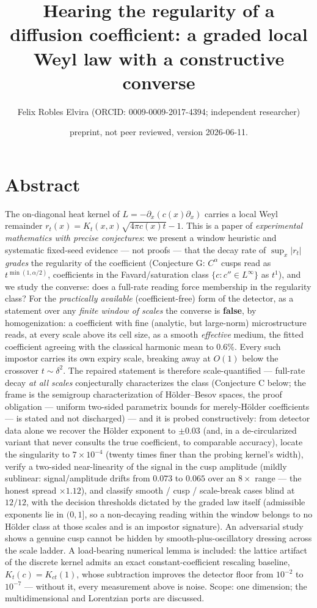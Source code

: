 \documentclass[11pt]{article}
\title{Hearing the regularity of a diffusion coefficient: a graded local Weyl law with a constructive converse}
\author{Felix Robles Elvira (ORCID: 0009-0009-2017-4394; independent researcher)}
\date{\small preprint, not peer reviewed, version 2026-06-11.}
\begin{document}
\maketitle

\section*{Abstract}
The on-diagonal heat kernel of $L = -\partial_x(c(x)\partial_x)$ carries a local Weyl remainder $r_t(x) = K_t(x,x)\sqrt{4\pi c(x)t} - 1$.  This is a paper of \emph{experimental mathematics with precise conjectures}: we present a window heuristic and systematic fixed-seed evidence — not proofs — that the decay rate of $\sup_x|r_t|$ \emph{grades} the regularity of the coefficient (Conjecture G: $C^\alpha$ cusps read as $t^{\min(1,\alpha/2)}$, coefficients in the Favard/saturation class $\{c : c'' \in L^\infty\}$ as $t^1$), and we study the converse: does a full-rate reading force membership in the regularity class?  For the \emph{practically available} (coefficient-free) form of the detector, as a statement over any \emph{finite window of scales} the converse is \textbf{false}, by homogenization: a coefficient with fine (analytic, but large-norm) microstructure reads, at every scale above its cell size, as a smooth \emph{effective} medium, the fitted coefficient agreeing with the classical harmonic mean to $0.6\%$.  Every such impostor carries its own expiry scale, breaking away at $O(1)$ below the crossover $t \sim \delta^2$.  The repaired statement is therefore scale-quantified — full-rate decay \emph{at all scales} conjecturally characterizes the class (Conjecture C below; the frame is the semigroup characterization of Hölder–Besov spaces, the proof obligation — uniform two-sided parametrix bounds for merely-Hölder coefficients — is stated and not discharged) — and it is probed constructively: from detector data alone we recover the Hölder exponent to $\pm 0.03$ (and, in a de-circularized variant that never consults the true coefficient, to comparable accuracy), locate the singularity to $7\times 10^{-4}$ (twenty times finer than the probing kernel's width), verify a two-sided near-linearity of the signal in the cusp amplitude (mildly sublinear: signal/amplitude drifts from $0.073$ to $0.065$ over an $8\times$ range — the honest spread $\times 1.12$), and classify smooth / cusp / scale-break cases blind at $12/12$, with the decision thresholds dictated by the graded law itself (admissible exponents lie in $(0,1]$, so a non-decaying reading within the window belongs to no Hölder class at those scales and is an impostor signature). An adversarial study shows a genuine cusp cannot be hidden by smooth-plus-oscillatory dressing across the scale ladder.  A load-bearing numerical lemma is included: the lattice artifact of the discrete kernel admits an exact constant-coefficient rescaling baseline, $K_t(c) = K_{ct}(1)$, whose subtraction improves the detector floor from $10^{-2}$ to $10^{-7}$ — without it, every measurement above is noise.  Scope: one dimension; the multidimensional and Lorentzian ports are discussed.
\end{document}
